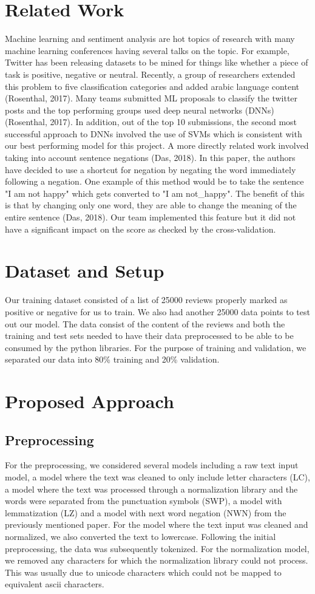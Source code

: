 \documentclass{amsart}
\theoremstyle{definition}
\theoremstyle{remark}
\numberwithin{equation}{section}
\begin{document}
\section{Related Work}
Machine learning and sentiment analysis are hot topics of research with many machine learning conferences having several talks on the topic.  For example, Twitter has been releasing datasets to be mined for things like whether a piece of task is positive, negative or neutral.  Recently, a group of researchers extended this problem to five classification categories and added arabic language content (Rosenthal, 2017).  Many teams submitted ML proposals to classify the twitter posts and the top performing groups used deep neural networks (DNNs) (Rosenthal, 2017).  In addition, out of the top 10 submissions, the second most successful approach to DNNs involved the use of SVMs which is consistent with our best performing model for this project.  A more directly related work involved taking into account sentence negations (Das, 2018).  In this paper, the authors have decided to use a shortcut for negation by negating the word immediately following a negation.  One example of this method would be to take the sentence "I am not happy" which gets converted to "I am not\_happy".  The benefit of this is that by changing only one word, they are able to change the meaning of the entire sentence (Das, 2018).  Our team implemented this feature but it did not have a significant impact on the score as checked by the cross-validation.
\section{Dataset and Setup}
Our training dataset consisted of a list of 25000 reviews properly marked as positive or negative for us to train.  We also had another 25000 data points to test out our model.  The data consist of the content of the reviews and both the training and test sets needed to have their data preprocessed to be able to be consumed by the python libraries.  For the purpose of training and validation, we separated our data into 80\% training and 20\% validation.
\section{Proposed Approach}
\subsection{Preprocessing}
For the preprocessing, we considered several models including a raw text input model, a model where the text was cleaned to only include letter characters (LC), a model where the text was processed through a normalization library and the words were separated from the punctuation symbols (SWP), a model with lemmatization (LZ) and a model with next word negation (NWN) from the previously mentioned paper.  For the model where the text input was cleaned and normalized, we also converted the text to lowercase.  Following the initial preprocessing, the data was subsequently tokenized.  For the normalization model, we removed any characters for which the normalization library could not process.  This was usually due to unicode characters which could not be mapped to equivalent ascii characters.
\end{document}
